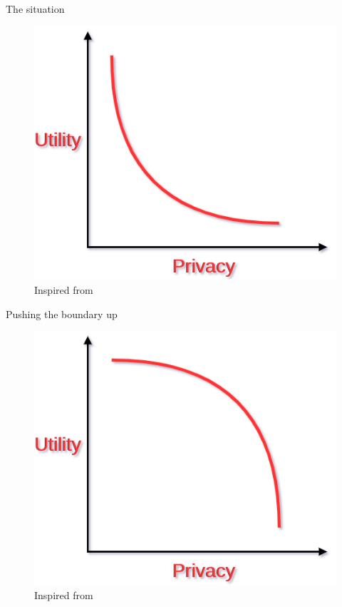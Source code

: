 \documentclass[11pt, british]{beamer}
\begin{document}
		\begin{frame}{The situation}
			\begin{figure}
				\includegraphics[width= 0.8\linewidth]{Imgs/Tradeoff.png}
				\caption{Inspired from \parencite{9}}
			\end{figure}
		\end{frame}
	
		\begin{frame}{Pushing the boundary up}
			\begin{figure}
				\includegraphics[width= 0.8\linewidth]{Imgs/SwapTradeoff.png}
				\caption{Inspired from \parencite{9}}
			\end{figure}
		\end{frame}
	
\end{document}
